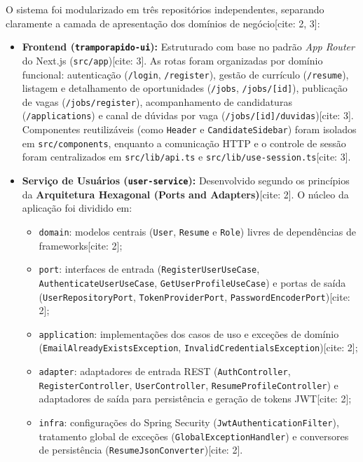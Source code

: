 \documentclass[
    12pt,
    oneside,
    a4paper,
    brazil
]{abntex2}
\begin{document}
O sistema foi modularizado em três repositórios independentes, separando claramente a camada de apresentação dos domínios de negócio[cite: 2, 3]:

\begin{itemize}
    \item \textbf{Frontend (\texttt{tramporapido-ui}):} Estruturado com base no padrão \textit{App Router} do Next.js (\texttt{src/app})[cite: 3]. As rotas foram organizadas por domínio funcional: autenticação (\texttt{/login}, \texttt{/register}), gestão de currículo (\texttt{/resume}), listagem e detalhamento de oportunidades (\texttt{/jobs}, \texttt{/jobs/[id]}), publicação de vagas (\texttt{/jobs/register}), acompanhamento de candidaturas (\texttt{/applications}) e canal de dúvidas por vaga (\texttt{/jobs/[id]/duvidas})[cite: 3]. Componentes reutilizáveis (como \texttt{Header} e \texttt{CandidateSidebar}) foram isolados em \texttt{src/components}, enquanto a comunicação HTTP e o controle de sessão foram centralizados em \texttt{src/lib/api.ts} e \texttt{src/lib/use-session.ts}[cite: 3].

    \item \textbf{Serviço de Usuários (\texttt{user-service}):} Desenvolvido segundo os princípios da \textbf{Arquitetura Hexagonal (Ports and Adapters)}[cite: 2]. O núcleo da aplicação foi dividido em:
    \begin{itemize}
        \item \texttt{domain}: modelos centrais (\texttt{User}, \texttt{Resume} e \texttt{Role}) livres de dependências de frameworks[cite: 2];
        \item \texttt{port}: interfaces de entrada (\texttt{RegisterUserUseCase}, \texttt{AuthenticateUserUseCase}, \texttt{GetUserProfileUseCase}) e portas de saída (\texttt{UserRepositoryPort}, \texttt{TokenProviderPort}, \texttt{PasswordEncoderPort})[cite: 2];
        \item \texttt{application}: implementações dos casos de uso e exceções de domínio (\texttt{EmailAlreadyExistsException}, \texttt{InvalidCredentialsException})[cite: 2];
        \item \texttt{adapter}: adaptadores de entrada REST (\texttt{AuthController}, \texttt{RegisterController}, \texttt{UserController}, \texttt{ResumeProfileController}) e adaptadores de saída para persistência e geração de tokens JWT[cite: 2];
        \item \texttt{infra}: configurações do Spring Security (\texttt{JwtAuthenticationFilter}), tratamento global de exceções (\texttt{GlobalExceptionHandler}) e conversores de persistência (\texttt{ResumeJsonConverter})[cite: 2].
    \end{itemize}


\end{itemize}
\end{document}
